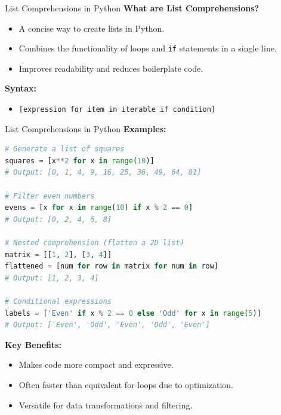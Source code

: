 \documentclass[10pt]{beamer}
\let\olditem\item
\renewcommand\item{\olditem\justifying}
\begin{document}
	\begin{frame}{List Comprehensions in Python}
		\textbf{What are List Comprehensions?}
		\begin{itemize}
			\item A concise way to create lists in Python.
			\item Combines the functionality of loops and \texttt{if} statements in a single line.
			\item Improves readability and reduces boilerplate code.
		\end{itemize}
		
		\textbf{Syntax:}
		\begin{itemize}
			\item \texttt{[expression for item in iterable if condition]}
		\end{itemize}
	
	\end{frame}
	\begin{frame}[fragile]{List Comprehensions in Python}
		\textbf{Examples:}
		\begin{lstlisting}[language=Python, caption=Examples of List Comprehensions]
# Generate a list of squares
squares = [x**2 for x in range(10)]  
# Output: [0, 1, 4, 9, 16, 25, 36, 49, 64, 81]

# Filter even numbers
evens = [x for x in range(10) if x % 2 == 0]
# Output: [0, 2, 4, 6, 8]

# Nested comprehension (flatten a 2D list)
matrix = [[1, 2], [3, 4]]
flattened = [num for row in matrix for num in row]
# Output: [1, 2, 3, 4]

# Conditional expressions
labels = ['Even' if x % 2 == 0 else 'Odd' for x in range(5)]
# Output: ['Even', 'Odd', 'Even', 'Odd', 'Even']
		\end{lstlisting}
		
		\textbf{Key Benefits:}
		\begin{itemize}
			\item Makes code more compact and expressive.
			\item Often faster than equivalent for-loops due to optimization.
			\item Versatile for data transformations and filtering.
		\end{itemize}
	\end{frame}
	
	
	
\end{document}
